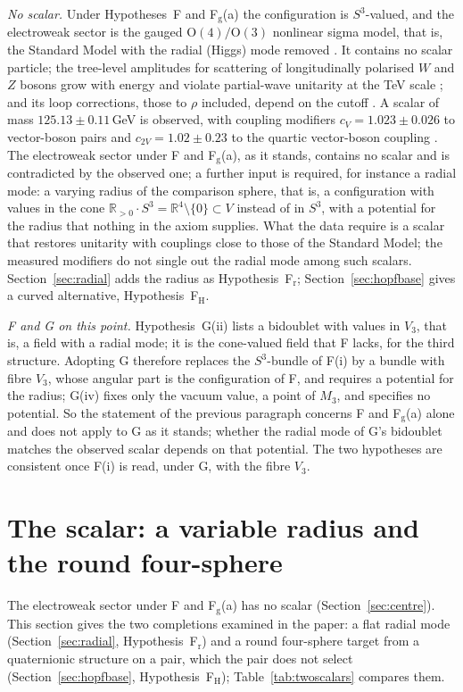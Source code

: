 \documentclass[aps,pra,onecolumn,superscriptaddress,nofootinbib,10pt]{revtex4-2}
\theoremstyle{definition}
\theoremstyle{remark}
\newcommand{\R}{\mathbb{R}}
\newcommand{\OO}{\mathrm{O}}
\begin{document}
\smallskip\noindent\emph{No scalar.}  Under Hypotheses~F and F$_{\mathrm g}$(a) the configuration is $S^3$-valued, and the
electroweak sector is the gauged $\OO(4)/\OO(3)$ nonlinear sigma model, that is, the Standard Model with the
radial (Higgs) mode removed \cite{AB80}.  It contains no scalar particle; the tree-level amplitudes for
scattering of longitudinally polarised $W$ and $Z$ bosons grow with energy and violate partial-wave
unitarity at the TeV scale \cite{LQT77}; and its loop corrections, those to $\rho$ included, depend on the
cutoff \cite{AB80}.  A scalar of mass $125.13\pm0.11$\,GeV is observed, with coupling modifiers
$c_V=1.023\pm0.026$ to vector-boson pairs and $c_{2V}=1.02\pm0.23$ to the quartic vector-boson coupling
\cite{ex-PDG26}.  The electroweak sector under F and F$_{\mathrm g}$(a), as it stands, contains no scalar and is
contradicted by the observed one; a further input is required, for instance a radial mode: a varying
radius of the comparison sphere, that is, a configuration with values in the cone
$\R_{>0}\cdot S^3=\R^4\setminus\{0\}\subset V$ instead of in $S^3$, with a potential for the radius that nothing in the axiom
supplies.  What the data require is a scalar that restores unitarity with couplings close to those of the
Standard Model; the measured modifiers do not single out the radial mode among such scalars.  Section~\ref{sec:radial}
adds the radius as Hypothesis~F$_{\mathrm r}$; Section~\ref{sec:hopfbase} gives a curved alternative, Hypothesis~F$_{\mathrm H}$.

\smallskip\noindent\emph{F and G on this point.}  Hypothesis~G(ii) lists a bidoublet with values in $V_3$, that is,
a field with a radial mode; it is the cone-valued field that F lacks, for the third structure.  Adopting
G therefore replaces the $S^3$-bundle of F(i) by a bundle with fibre $V_3$, whose angular part is the
configuration of F, and requires a potential for the radius; G(iv) fixes only the vacuum value, a point of
$M_3$, and specifies no potential.  So the statement of the previous paragraph concerns F and F$_{\mathrm g}$(a)
alone and does not apply to G as it stands; whether the radial mode of G's bidoublet matches the
observed scalar depends on that potential.  The two hypotheses are consistent once F(i) is read, under
G, with the fibre $V_3$.


\section{The scalar: a variable radius and the round four-sphere}\label{sec:scalar}
The electroweak sector under F and F$_{\mathrm g}$(a) has no scalar (Section~\ref{sec:centre}).  This section gives the two
completions examined in the paper: a flat radial mode (Section~\ref{sec:radial}, Hypothesis~F$_{\mathrm r}$) and a round
four-sphere target from a quaternionic structure on a pair, which the pair does not select (Section~\ref{sec:hopfbase},
Hypothesis~F$_{\mathrm H}$); Table~\ref{tab:twoscalars} compares them.
\end{document}
